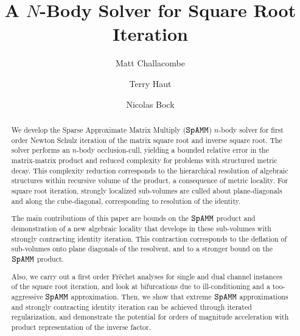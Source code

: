\documentclass[letterpaper,twocolumn,amsmath,amsfont,amssymb,english,aps,jcp,preprintnumbers,groupaddress,nofootinbib,tightenlines,floatfix]{revtex4}
\theoremstyle{plain}
\theoremstyle{remark}
\theoremstyle{plain}
\begin{document}
\title{A $N$-Body Solver for Square Root Iteration}

\author{Matt Challacombe}

\author{Terry Haut}

\author{Nicolas Bock}



\begin{abstract}
We develop the Sparse Approximate Matrix Multiply ($\tt SpAMM$) $n$-body solver for first order Newton Schulz iteration of the 
matrix square root and inverse square root.
The solver performs an $n$-body occlusion-cull, yielding a bounded relative error in the matrix-matrix product
and reduced complexity for problems with structured metric decay.  This complexity reduction corresponds to 
the hierarchical resolution of algebraic structures within recursive volume of the product, a consequence of 
metric locality.  For square root iteration, strongly localized sub-volumes are  culled about 
plane-diagonals and along the cube-diagonal,  corresponding to resolution of the identity.  

The main contributions of this paper are bounds on the $\tt SpAMM$ product and 
demonstration of a new algebraic locality that develops in these sub-volumes with strongly 
contracting identity iteration. This contraction corresponds to the deflation of sub-volumes 
onto plane diagonals of the resolvent, and to a stronger bound on the $\tt SpAMM$ product.  

Also, we carry out a first order Fr\"{e}chet analyses for single and 
dual channel instances of the square root iteration, and look at bifurcations due to ill-conditioning and a 
too-aggressive $\tt SpAMM$ approximation.  Then, we show that extreme $\tt SpAMM$ approximations and strongly contracting 
identity iteration can be achieved through iterated regularization, and demonstrate the potential for orders of magnitude 
acceleration with product representation of the inverse factor.   

\end{abstract}

\maketitle
\end{document}

